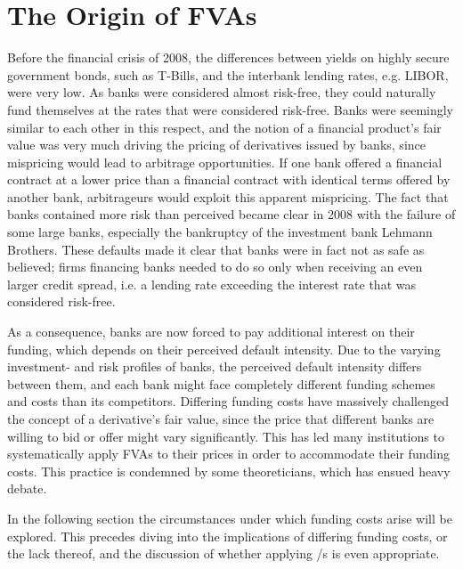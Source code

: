 \documentclass[main.tex]{subfiles}
\begin{document}
    \section{The Origin of FVAs}
        Before the financial crisis of 2008, 
        the differences between yields on highly secure government bonds, such as T-Bills,
        and the interbank lending rates, e.g. LIBOR, were very low.
        As banks were considered almost risk-free, 
        they could naturally fund themselves at the rates that were considered risk-free.
        Banks were seemingly similar to each other in this respect, 
        and the notion of a financial product's fair value was very much driving the pricing of derivatives issued by banks,
        since mispricing would lead to arbitrage opportunities.
        If one bank offered a financial contract at a lower price than a financial contract with identical terms
        offered by another bank, arbitrageurs would exploit this apparent mispricing. 
        The fact that banks contained more risk than perceived became clear in 2008
        with the failure of some large banks, 
        especially the bankruptcy of the investment bank Lehmann Brothers.
        These defaults made it clear that banks were in fact not as safe as believed; 
        firms financing banks needed to do so only when receiving an even larger credit spread,
        i.e. a lending rate exceeding the interest rate that was considered risk-free. 
        
        As a consequence, banks are now forced to pay additional interest on their funding, 
        which depends on their perceived default intensity.
        Due to the varying investment- and risk profiles of banks, 
        the perceived default intensity differs between them, 
        and each bank might face completely different funding schemes and costs than its competitors.
        Differing funding costs have massively challenged the concept of a derivative's fair value,
        since the price that different banks are willing to bid or offer might vary significantly. 
        This has led many institutions to systematically apply FVAs to their prices
        in order to accommodate their funding costs. 
        This practice is condemned by some theoreticians, 
        which has ensued heavy debate.
        
        In the following section the circumstances under which funding costs arise will be explored.
        This precedes diving into the implications of differing funding costs, or the lack thereof,
        and the discussion of whether applying \FVA/s is even appropriate.
\end{document}
